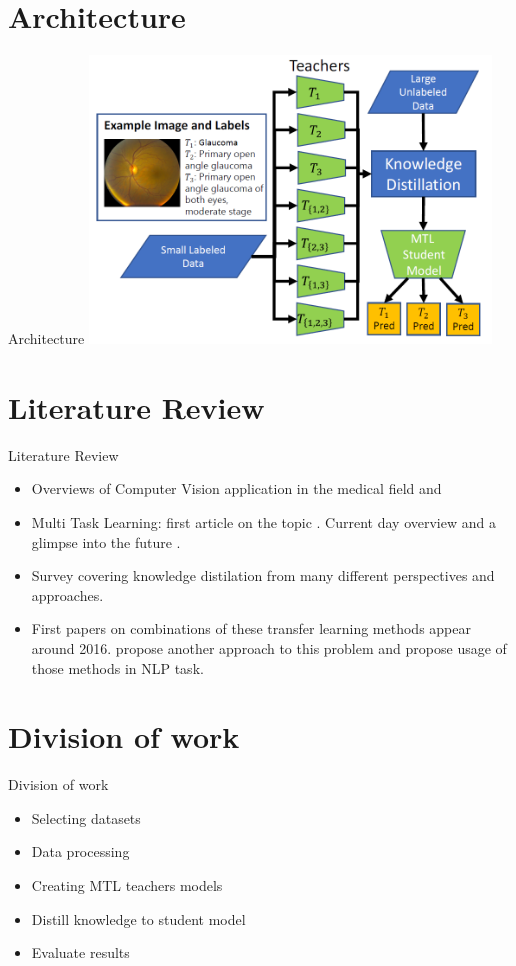\documentclass [xcolor=svgnames, t] {beamer}
\begin{document}
\section{Architecture}
\begin{frame}{Architecture}
   \includegraphics[width=0.8\textwidth]{Archi.PNG}
\end{frame}



\section{Literature Review}
\begin{frame}{Literature Review}
    \begin{itemize}
        \item Overviews of Computer Vision application in the medical field  \cite{OverviewMedical1} and \cite{OverviewMedical2}
        \item Multi Task Learning: first article on the topic  \cite{Multitask1}. Current day overview and a glimpse into the future \cite{Multitask2}.
        \item Survey covering knowledge distilation \cite{KD1} from many different perspectives and approaches.
        \item First papers on combinations of these transfer learning methods appear around 2016. \cite{MTKD2} propose another approach to this problem and \cite{MTKD1} propose usage of those methods in NLP task.
    \end{itemize}
\end{frame}



\section{Division of work}
\begin{frame}{Division of work}
\begin{itemize}
    \item Selecting datasets
    \item Data processing
    \item Creating MTL teachers models
    \item Distill knowledge to student model
    \item Evaluate results
\end{itemize}
\end{frame}
\end{document}
